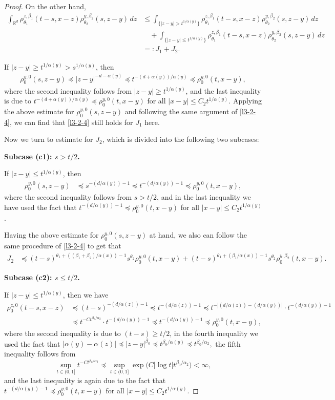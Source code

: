 \documentclass[a4paper,11pt]{amsart}
\renewcommand{\le}{\leqslant}
\renewcommand{\ge}{\geqslant}
\newcommand{\R}{\mathds R}
\newcommand{\B}{\beta}
\newcommand{\T}{\theta}
\newcommand{\p}{\preceq}
\newcommand{\A}{\alpha}
\theoremstyle{definition}
\begin{document}
\begin{proof}
On the other hand,
\begin{align*}
 \int_{\R^d}\rho_{\T_1}^{z,\B_1}(t-s,x-z)\rho_{\T_2}^{y,\B_2}(s,z-y)\,dz
&\le \int_{\{|z-y|> t^{{1/\A(y)}}\}}\rho_{\T_1}^{z,\B_1}(t-s,x-z)\rho_{\T_2}^{y,\B_2}(s,z-y)\,dz\\
&\quad+\int_{\{|z-y|\le t^{{1/\A(y)}}\}}\rho_{\T_1}^{z,\B_1}(t-s,x-z)\rho_{\T_2}^{y,\B_2}(s,z-y)\, dz\\
&=:J_1+J_2.
\end{align*}

If $|z-y|\ge t^{{1/\A(y)}}>s^{{1/\A(y)}}$, then
\begin{align*}
\rho_0^{y,0}(s,z-y)\p |z-y|^{-d-\A(y)}\p t^{-({d+\A(y)})/{\A(y)}}\p \rho_0^{y,0}(t,x-y),
\end{align*}
where the second inequality follows from $|z-y|\ge t^{{1/\A(y)}}$, and the last inequality
is due to $t^{-({d+\A(y)})/{\A(y)}}\p \rho_0^{y,0}(t,x-y)$ for all $|x-y|\le C_2t^{{1/\A(y)}}$. Applying the above estimate for $\rho_0^{y,0}(s,z-y)$ and following the same argument of \eqref{l3-2-4}, we can find that \eqref{l3-2-4} still holds
for $J_1$ here.



Now we turn to estimate for $J_2$, which is divided into the following two subcases:

{\bf Subcase (c1): $s>{t}/{2}$.}

If $|z-y|\le t^{{1/\A(y)}}$, then
\begin{align*}
\rho_0^{y,0}(s,z-y)&\p s^{-({d/\A(y)})-1}\p t^{-({d/\A(y)})-1}\p \rho_0^{y,0}(t,x-y),
\end{align*}
where the second inequality follows
from $s>{t}/{2}$, and in the last inequality we have used the fact that
$t^{-({d/\A(y)})-1}\p \rho_0^{y,0}(t,x-y)$ for all $|x-y|\le C_2t^{{1/\A(y)}}$.

Having the above estimate for $\rho_0^{y,0}(s,z-y)$ at hand, we also can follow the same procedure of \eqref{l3-2-4} to get that \begin{align*}
J_2&\p (t-s)^{\T_1+(({\B_1+\B_2})/{\A(x)})-1}s^{\T_2}\rho_0^{y,0}(t,x-y)+
(t-s)^{\T_1+({\B_1}/{\A(x)})-1}s^{\T_2}\rho_0^{y,\B_2}(t,x-y).
\end{align*}


{\bf Subcase (c2): $s\le {t}/{2}$.}

If $|z-y|\le t^{{1/\A(y)}}$,
then we have
\begin{align*}
\rho_0^{z,0}(t-s,x-z)&\p (t-s)^{-({d}/{\A(z)})-1}\p t^{-({d}/{\A(z)})-1}\p t^{-|({d}/{\A(z)})-({d/\A(y)})|}\cdot t^{-({d/\A(y)})-1}\\
&\p t^{-Ct^{{\B_0}/{\A_2}}}\cdot t^{-({d/\A(y)})-1}\p t^{-({d/\A(y)})-1}\p \rho_0^{y,0}(t,x-y),
\end{align*}
where the second inequality is due to $(t-s)\ge {t}/{2}$, in the
fourth inequality we used the fact that
$|\A(y)-\A(z)|\p |z-y|^{\beta_0}\p t^{{\B_0}/{\A(y)}}\p
t^{{\B_0}/{\A_2}},$ the fifth inequality follows from
$$\sup_{t \in (0,1]}t^{-Ct^{{\B_0}/{\A_2}}}\p \sup_{t \in (0,1]}
\exp\big(C|\log t|t^{{\B_0}/{\A_2}}\big)<\infty,$$ and the last
inequality is again due to the fact that $t^{-({d/\A(y)})-1}\p
\rho_0^{y,0}(t,x-y)$ for all $|x-y|\le C_2t^{{1/\A(y)}}$.


\end{proof}
\end{document}
